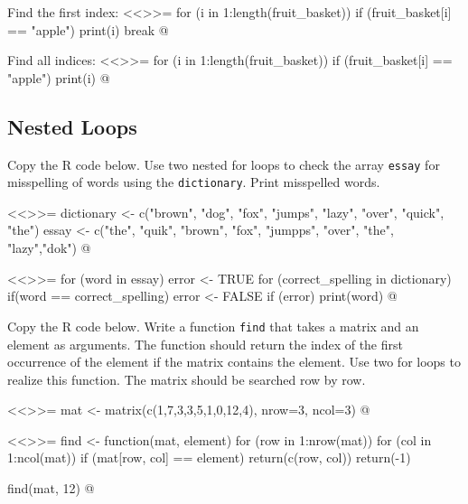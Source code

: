 \documentclass
[answers]
{exercise_sheet}
\begin{document}
\makeatletter\if@answers\begin{Answer}{10}
Find the first index:
<<>>=
for (i in 1:length(fruit_basket)) {
  if (fruit_basket[i] == "apple") {
    print(i)
    break
  }
}
@

Find all indices:
<<>>=
for (i in 1:length(fruit_basket)) {
  if (fruit_basket[i] == "apple") {
    print(i)
  }
}
@
\end{Answer}\fi\makeatother

\subsection*{Nested Loops}

\begin{Question}{8}
Copy the R code below. Use two nested for loops to check the array \verb|essay| for misspelling of words using the \verb|dictionary|. Print misspelled words.

<<>>=
dictionary <- c("brown", "dog", "fox", "jumps",
                "lazy", "over", "quick", "the")
essay <- c("the", "quik", "brown", "fox",
           "jumpps", "over", "the", "lazy","dok")
@
\end{Question}

\makeatletter\if@answers\begin{Answer}{14}
<<>>=
for (word in essay) {
  error <- TRUE
  for (correct_spelling in dictionary) {
    if(word == correct_spelling) {
  	  error <- FALSE
  	}
  }
  if (error) {
    print(word)
  }
}
@

\end{Answer}\fi\makeatother

\begin{Question}{7}
Copy the R code below. Write a function \verb|find| that takes a matrix and an element as arguments. The function should return the index of the first occurrence of the element if the matrix contains the element. Use two for loops to realize this function. The matrix should be searched row by row.

<<>>=
mat <- matrix(c(1,7,3,3,5,1,0,12,4), nrow=3, ncol=3)
@
\end{Question}

\makeatletter\if@answers\begin{Answer}{8}
<<>>=
find <- function(mat, element) {
  for (row in 1:nrow(mat)) {
    for (col in 1:ncol(mat)) {
      if (mat[row, col] == element) {
  	    return(c(row, col))
  	  }
    }
  }
  return(-1)
}

find(mat, 12)
@
\end{Answer}\fi\makeatother
\end{document}
